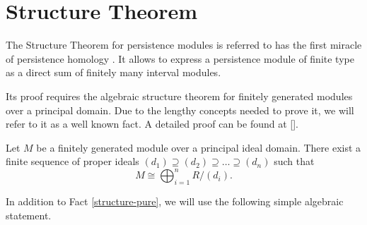 \begin{definition}
     
\end{definition}

\begin{definition} \label{delta-matching}
    
\end{definition}

\begin{definition}
    
\end{definition}

\newpage
\section{Structure Theorem}
The Structure Theorem for persistence modules is referred to has the first miracle of persistence homology \cite{nanda}. It allows to express a persistence module of finite type as a direct sum of finitely many interval modules.

Its proof requires the algebraic structure theorem for finitely generated modules  over a principal domain. Due to the lengthy concepts needed to prove it, we will refer to it as a well known fact. A detailed proof can be found at [].

\begin{fact} \label{structure-pure}
    Let $ M $ be a  finitely generated module over a principal ideal domain. There exist a finite sequence of proper ideals $ (d_1) \supseteq (d_2) \supseteq \dots \supseteq (d_n) $ such that
    $$
        M \cong \bigoplus_{i=1}^n R / (d_i).
    $$
\end{fact}

In addition to Fact \ref{structure-pure}, we will use the following simple algebraic statement.

